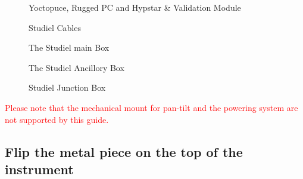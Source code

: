 \clearpage



\begin{figure}[!ht]
	\centering
		\caption{Yoctopuce, Rugged PC and Hypstar \& Validation Module}
		\label{fig:hypstarYocto}
\end{figure}

\begin{figure}[!h]
	\centering
	\begin{minipage}[b]{.8\textwidth}
		\caption{Studiel Cables}
		\label{fig:StudielCable}
	\end{minipage}
\end{figure}


\begin{figure}[!ht]
  \centering
  \begin{minipage}[b]{0.49\textwidth}
	  \vspace{-20pt}
	  \caption{The Studiel main Box}
	\label{fig:StudielBoxMain}
  \end{minipage}
  \hfill
  \begin{minipage}[b]{0.49\textwidth}
	  \vspace{-20pt}
	  \caption{The Studiel Ancillory Box}
	\label{fig:StudielBoxAnci}
  \end{minipage}
\end{figure}
\vspace{40pt}
\begin{figure}[!ht]
	\centering
	\begin{minipage}[b]{\textwidth}
		\vspace{-20pt}
		\caption{Studiel Junction Box}
		\label{fig:StudielJunction}
	\end{minipage}
\end{figure}
\vspace{-10pt}
\noindent \textcolor{red}{Please note that the mechanical mount for pan-tilt
and the powering system are not supported by this guide.}

\newpage
\clearpage

\subsection{Flip the metal piece on the top of the  instrument}

